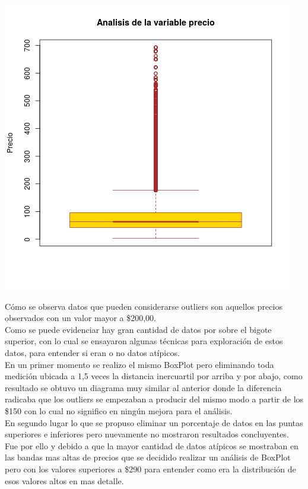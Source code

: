 \begin{center}
    \includegraphics[scale=0.6]{img/boxplot_basico.png}
\end{center}




Cómo se observa datos que pueden considerarse outliers son aquellos precios observados con un valor mayor a \$200,00. \\
Como se puede evidenciar hay gran cantidad de datos por sobre el bigote superior, con lo cual se ensayaron algunas técnicas para exploración de estos datos, para entender si eran o no datos atípicos.\\
En un primer momento se realizo el mismo BoxPlot pero eliminando toda medición ubicada a 1,5 veces la distancia inercuartil por arriba y por abajo, como resultado se obtuvo un diagrama muy similar al anterior donde la diferencia radicaba que los outliers se empezaban a producir del mismo modo a partir de los \$150 con lo cual no significo en ningún mejora para el análisis.\\
En segundo lugar lo que se propuso eliminar un porcentaje de datos en las puntas superiores e inferiores pero nuevamente no mostraron resultados concluyentes.\\
Fue por ello y debido a que la mayor cantidad de datos atípicos se mostraban en las bandas mas altas de precios que se decidido realizar un análisis de BoxPlot pero con los valores superiores a \$290 para entender como era la distribución de esos valores altos en mas detalle.


